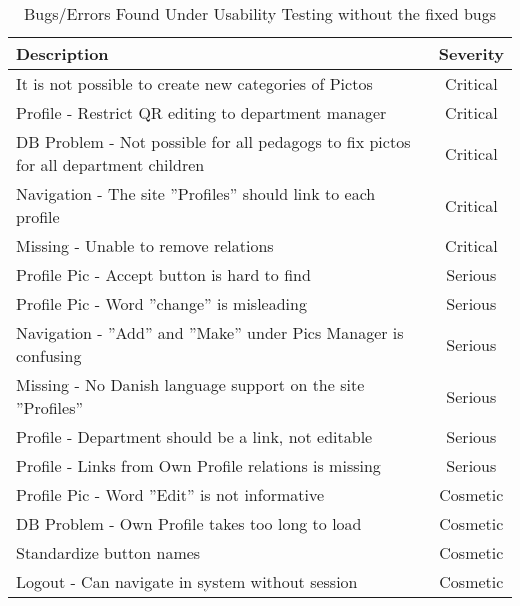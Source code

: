 \begin{table}[htbp]
	\centering
		\begin{tabularx}{\linewidth}{| X | c |}
			\hline
			Description & Severity\\\hline\hline
			It is not possible to create new categories of Pictos & Critical \\\hline
			Profile - Restrict QR editing to department manager & Critical \\\hline 
			DB Problem - Not possible for all pedagogs to fix pictos for all department children & Critical \\\hline
			Navigation - The site ''Profiles'' should link to each profile & Critical \\\hline
			Missing - Unable to remove relations & Critical \\\hline
			Profile Pic - Accept button is hard to find & Serious \\\hline
			Profile Pic - Word ''change'' is misleading & Serious \\\hline
			Navigation - ''Add'' and ''Make'' under Pics Manager is confusing & Serious \\\hline
			Missing - No Danish language support on the site ''Profiles''& Serious \\\hline
			Profile - Department should be a link, not editable & Serious \\\hline
			Profile - Links from Own Profile relations is missing & Serious \\\hline
			Profile Pic - Word ''Edit'' is not informative & Cosmetic \\\hline
			DB Problem - Own Profile takes too long to load & Cosmetic   \\\hline
			Standardize button names & Cosmetic \\\hline
			Logout - Can navigate in system without session & Cosmetic \\\hline
	\end{tabularx}
	\caption{Bugs/Errors Found Under Usability Testing without the fixed bugs}
	\label{tab:Bugs/ErrorsMinusTheDone}
\end{table}


